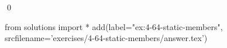 
\begin{ex}
  \label{ex:4-64-static-members}
  
  \qed
\end{ex}
\begin{python0}
from solutions import *
add(label="ex:4-64-static-members",
    srcfilename='exercises/4-64-static-members/answer.tex')
\end{python0}

